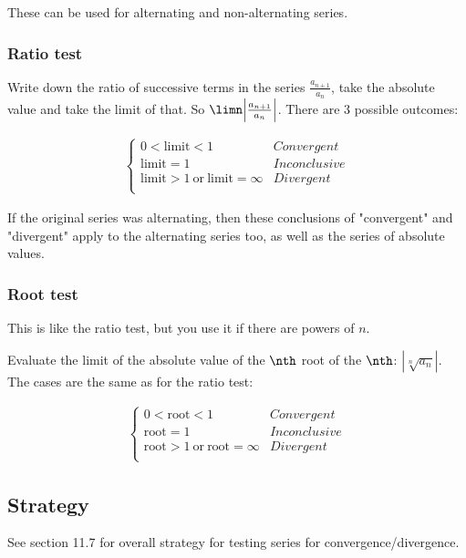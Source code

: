 These can be used for alternating and non-alternating series.

\subsubsection{Ratio test}
Write down the ratio of successive terms in the series $\frac{a_{n+1}}{a_n}$, take the absolute value and take the limit of that. So $\limn \Big|\frac{a_{n+1}}{a_n}\Big|$. There are 3 possible outcomes:

\begin{align*}
  \begin{cases}
    0 < \text{limit} < 1&Convergent\\
    \text{limit} = 1&Inconclusive\\
    \text{limit} > 1 ~\text{or}~ \text{limit} = \infty&Divergent\\
  \end{cases}
\end{align*}

If the original series was alternating, then these conclusions of "convergent" and "divergent" apply to the alternating series too, as well as the series of absolute values.


\subsubsection{Root test}
This is like the ratio test, but you use it if there are powers of $n$.

Evaluate the limit of the absolute value of the $\nth$ root of the $\nth$: $|\sqrt[n]{a_n}|$. The cases are the same as for the ratio test:


\begin{align*}
  \begin{cases}
    0 < \text{root} < 1&Convergent\\
    \text{root} = 1&Inconclusive\\
    \text{root} > 1 ~\text{or}~ \text{root} = \infty&Divergent\\
  \end{cases}
\end{align*}



\subsection{Strategy}

See section 11.7 for overall strategy for testing series for convergence/divergence.


